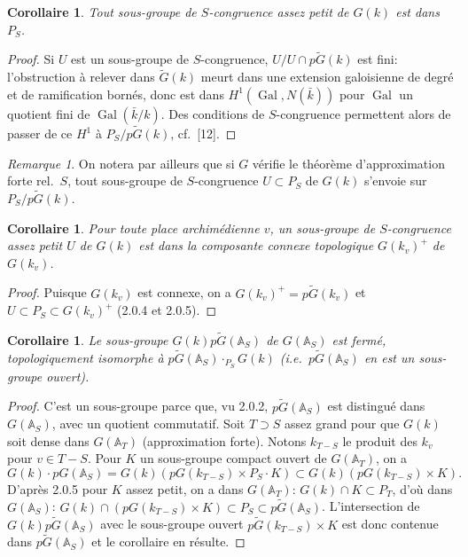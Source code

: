 \documentclass[12pt,a4paper]{article}
\theoremstyle{plain}
\newtheorem{corollary}[theorem]{Corollaire}
\theoremstyle{definition}
\theoremstyle{remark}
\newtheorem{remark}[theorem]{Remarque}
\DeclareMathOperator{\Gal}{Gal}
\newcommand{\A}{\mathbb{A}}
\begin{document}
\begin{corollary}
Tout sous-groupe de $S$-congruence assez petit de $G(k)$ est dans $P_S$.
\end{corollary}

\begin{proof}
Si $U$ est un sous-groupe de $S$-congruence, $U/U \cap p\tilde{G}(k)$ est fini: l'obstruction \`a relever dans $\tilde{G}(k)$ meurt dans une extension galoisienne de degr\'e et de ramification born\'es, donc est dans $H^1(\Gal, N(\bar{k}))$ pour $\Gal$ un quotient fini de $\Gal(\bar{k}/k)$. Des conditions de $S$-congruence permettent alors de passer de ce $H^1$ \`a $P_S/p\tilde{G}(k)$, cf.~[12].
\end{proof}

\begin{remark}
On notera par ailleurs que si $G$ v\'erifie le th\'eor\`eme d'approximation forte rel.~$S$, tout sous-groupe de $S$-congruence $U \subset P_S$ de $G(k)$ s'envoie sur $P_S/p\tilde{G}(k)$.
\end{remark}

\begin{corollary}
Pour toute place archim\'edienne $v$, un sous-groupe de $S$-congruence assez petit $U$ de $G(k)$ est dans la composante connexe topologique $G(k_v)^+$ de $G(k_v)$.
\end{corollary}

\begin{proof}
Puisque $G(k_v)$ est connexe, on a $G(k_v)^+ = p\tilde{G}(k_v)$ et $U \subset P_S \subset G(k_v)^+$ (2.0.4 et 2.0.5).
\end{proof}

\begin{corollary}
Le sous-groupe $G(k)p\tilde{G}(\A_S)$ de $G(\A_S)$ est ferm\'e, topologiquement isomorphe \`a $p\tilde{G}(\A_S) \cdot_{P_S} G(k)$ (i.e.~$p\tilde{G}(\A_S)$ en est un sous-groupe ouvert).
\end{corollary}

\begin{proof}
C'est un sous-groupe parce que, vu 2.0.2, $p\tilde{G}(\A_S)$ est distingu\'e dans $G(\A_S)$, avec un quotient commutatif. Soit $T \supset S$ assez grand pour que $G(k)$ soit dense dans $G(\A_T)$ (approximation forte). Notons $k_{T-S}$ le produit des $k_v$ pour $v \in T-S$. Pour $K$ un sous-groupe compact ouvert de $G(\A_T)$, on a
\[
G(k) \cdot pG(\A_S) = G(k)(pG(k_{T-S}) \times P_S \cdot K) \subset G(k)(pG(k_{T-S}) \times K).
\]
D'apr\`es 2.0.5 pour $K$ assez petit, on a dans $G(\A_T)$: $G(k) \cap K \subset P_T$, d'o\`u dans $G(\A_S)$: $G(k) \cap (pG(k_{T-S}) \times K) \subset P_S \subset p\tilde{G}(\A_S)$. L'intersection de $G(k)p\tilde{G}(\A_S)$ avec le sous-groupe ouvert $p\tilde{G}(k_{T-S}) \times K$ est donc contenue dans $p\tilde{G}(\A_S)$ et le corollaire en r\'esulte.
\end{proof}
\end{document}

